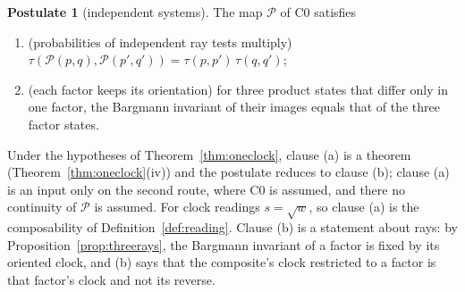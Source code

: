 \documentclass[aps,pra,onecolumn,superscriptaddress,nofootinbib,10pt]{revtex4-2}
\theoremstyle{definition}
\newtheorem{postulate}{Postulate}
\theoremstyle{remark}
\begin{document}
\begin{postulate}[independent systems]\label{post:C1}
The map $\mathcal P$ of C0 satisfies
\begin{enumerate}[label=(\alph*),leftmargin=2em]
\item (probabilities of independent ray tests multiply)
$\tau(\mathcal P(p,q),\mathcal P(p',q'))=\tau(p,p')\,\tau(q,q')$;
\item (each factor keeps its orientation) for three product states that differ only in one factor, the
Bargmann invariant of their images equals that of the three factor states.
\end{enumerate}
\end{postulate}
Under the hypotheses of Theorem~\ref{thm:oneclock}, clause (a) is a theorem (Theorem~\ref{thm:oneclock}(iv))
and the postulate reduces to clause (b); clause (a) is an input only on the second route, where C0 is
assumed, and there no continuity of $\mathcal P$ is assumed.  For clock readings $s=\sqrt w$, so clause (a) is the
composability of Definition~\ref{def:reading}.  Clause (b) is a statement about rays: by
Proposition~\ref{prop:threerays}, the Bargmann invariant of a factor is fixed by its oriented clock, and
(b) says that the composite's clock restricted to a factor is that factor's clock and not its
reverse.
\end{document}
